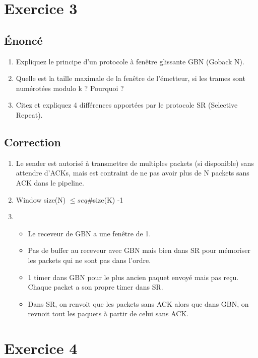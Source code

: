 \documentclass[a4paper, 11pt, titlepage]{article}
\begin{document}
\section{Exercice 3}
\subsection{\'Enoncé}
\begin{enumerate}[label=(\alph*)]
\item Expliquez le principe d’un protocole à fenêtre glissante GBN (Goback N).
\item Quelle est la taille maximale de la fenêtre de l’émetteur, si les trames sont numérotées modulo k ? Pourquoi ?
\item Citez et expliquez 4 différences apportées par le protocole SR (Selective Repeat).
\end{enumerate}

\subsection{Correction}
\begin{enumerate}[label=(\alph*)]
\item
Le sender est autorisé à transmettre de multiples packets (si disponible) sans attendre d'ACKs, mais est contraint de ne pas avoir plus de N packets sans ACK dans le pipeline.

\item 
Window size(N) $\leq seq\# $size(K) -1 

\item  
\begin{itemize}
\item Le receveur de GBN a une fenêtre de 1.
\item Pas de buffer au receveur avec GBN mais bien dans SR pour mémoriser les packets qui ne sont pas dans l'ordre.
\item 1 timer dans GBN pour le plus ancien paquet envoyé mais pas reçu. Chaque packet a son propre timer dans SR.
\item Dans SR, on renvoit que les packets sans ACK alors que dans GBN, on revnoit tout les paquets à partir de celui sans ACK.
\end{itemize}

\end{enumerate}



\section{Exercice 4}
\end{document}
